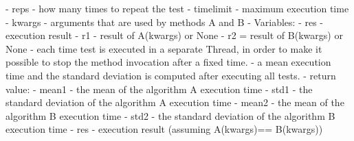 \documentclass[11pt]{article}
\begin{document}
    - reps - how many times to repeat the test\newline
     - timelimit - maximum execution time - kwargs \newline
     - arguments that are used by methods A and B \newline
     - Variables: \newline
     - res - execution result \newline
     - r1 - result of A(kwargs) or None \newline
     - r2 = result of B(kwargs) or None \newline
     - each time test is executed in a separate Thread, in order to make it possible to stop the method
invocation after a fixed time. \newline
- a mean execution time and the standard
deviation is computed after executing all tests. \newline
- return value: \newline
- mean1 - the mean of the algorithm A execution time \newline
- std1 - the standard deviation of the algorithm A execution time \newline
- mean2 - the mean of the algorithm B execution time \newline
- std2 - the standard deviation of the algorithm B execution time \newline
- res - execution result (assuming A(kwargs)== B(kwargs))
\end{document}
